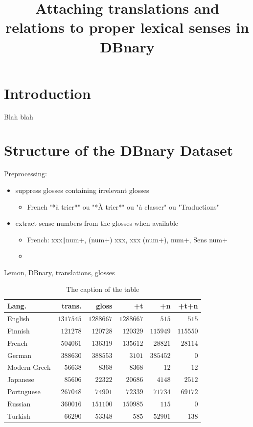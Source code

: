 \documentclass[10pt, a4paper]{article}
\title{Attaching translations and relations to proper lexical senses in DBnary}
\begin{document}
\maketitleabstract

\section{Introduction}
Blah blah

\section{Structure of the DBnary Dataset}

Preprocessing:

\begin{itemize}
   \item suppress glosses containing irrelevant glosses
   \begin{itemize}
      \item French "*à trier*" ou "*À trier*" ou "à classer" ou "Traductions"
   \end{itemize}
   \item extract sense numbers from the glosses when available
   \begin{itemize}
      \item French: xxx\texttt{|}num+, (num+) xxx, xxx (num+), num+, Sens num+
      \item 
   \end{itemize}
\end{itemize}
Lemon, DBnary, translations, glosses

\begin{table}[h]
\begin{center}\begin{footnotesize}
\begin{tabular}{lrrrrr}
\textbf{Lang.} & \textbf{trans.} & \textbf{gloss} & \textbf{+t} &  \textbf{+n} & \textbf{+t+n}\\
\hline
English & $1317545$ & $1288667$ & $1288667$ & $515$ & $515$ \\
Finnish & $121278$ & $120728$ & $120329$ & $115949$ & $115550$ \\
French & $504061$ & $136319$ & $135612$ & $28821$ & $28114$ \\
German & $388630$ & $388553$ & $3101$ & $385452$ & $0$ \\
Modern Greek & $56638$ & $8368$ & $8368$ & $12$ & $12$ \\
Japanese & $85606$ & $22322$ & $20686$ & $4148$ & $2512$ \\
Portuguese & $267048$ & $74901$ & $72339$ & $71734$ & $69172$ \\
Russian & $360016$ & $151100$ & $150985$ & $115$ & $0$ \\
Turkish & $66290$ & $53348$ & $585$ & $52901$ & $138$ \\
\hline
\end{tabular}
\caption{The caption of the table}
\end{footnotesize}\end{center}
\end{table}
\end{document}

